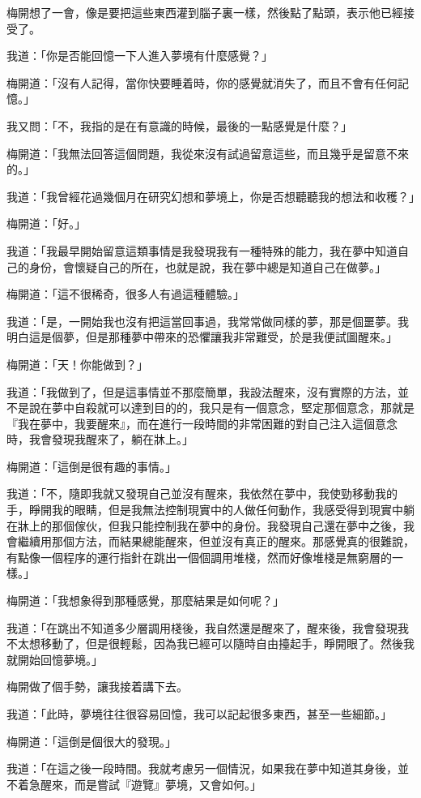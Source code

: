 梅開想了一會，像是要把這些東西灌到腦子裏一樣，然後點了點頭，表示他已經接受了。

我道：「你是否能回憶一下人進入夢境有什麼感覺？」

梅開道：「沒有人記得，當你快要睡着時，你的感覺就消失了，而且不會有任何記憶。」

我又問：「不，我指的是在有意識的時候，最後的一點感覺是什麼？」

梅開道：「我無法回答這個問題，我從來沒有試過留意這些，而且幾乎是留意不來的。」

我道：「我曾經花過幾個月在研究幻想和夢境上，你是否想聽聽我的想法和收穫？」

梅開道：「好。」

我道：「我最早開始留意這類事情是我發現我有一種特殊的能力，我在夢中知道自己的身份，會懷疑自己的所在，也就是說，我在夢中總是知道自己在做夢。」

梅開道：「這不很稀奇，很多人有過這種體驗。」

我道：「是，一開始我也沒有把這當回事過，我常常做同樣的夢，那是個噩夢。我明白這是個夢，但是那種夢中帶來的恐懼讓我非常難受，於是我便試圖醒來。」

梅開道：「天！你能做到？」

我道：「我做到了，但是這事情並不那麼簡單，我設法醒來，沒有實際的方法，並不是說在夢中自殺就可以達到目的的，我只是有一個意念，堅定那個意念，那就是『我在夢中，我要醒來』，而在進行一段時間的非常困難的對自己注入這個意念時，我會發現我醒來了，躺在牀上。」

梅開道：「這倒是很有趣的事情。」

我道：「不，隨即我就又發現自己並沒有醒來，我依然在夢中，我使勁移動我的手，睜開我的眼睛，但是我無法控制現實中的人做任何動作，我感受得到現實中躺在牀上的那個傢伙，但我只能控制我在夢中的身份。我發現自己還在夢中之後，我會繼續用那個方法，而結果總能醒來，但並沒有真正的醒來。那感覺真的很難說，有點像一個程序的運行指針在跳出一個個調用堆棧，然而好像堆棧是無窮層的一樣。」

梅開道：「我想象得到那種感覺，那麼結果是如何呢？」

我道：「在跳出不知道多少層調用棧後，我自然還是醒來了，醒來後，我會發現我不太想移動了，但是很輕鬆，因為我已經可以隨時自由擡起手，睜開眼了。然後我就開始回憶夢境。」

梅開做了個手勢，讓我接着講下去。

我道：「此時，夢境往往很容易回憶，我可以記起很多東西，甚至一些細節。」

梅開道：「這倒是個很大的發現。」

我道：「在這之後一段時間。我就考慮另一個情況，如果我在夢中知道其身後，並不着急醒來，而是嘗試『遊覽』夢境，又會如何。」

